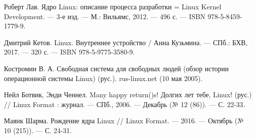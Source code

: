 




\begin{thebibliography}{99}
Роберт Лав. Ядро Linux: описание процесса разработки = Linux Kernel Development. — 3-е изд. — М.: Вильямс, 2012. — 496 с. — ISBN 978-5-8459-1779-9.

Дмитрий Кетов. Linux. Внутреннее устройство / Анна Кузьмина. — СПб.: БХВ, 2017. — 320 с. — ISBN 978-5-9775-3580-9.

Костромин В. А. Свободная система для свободных людей (обзор истории операционной системы Linux) (рус.). rus-linux.net (10 мая 2005).

Нейл Ботвик, Энди Ченнел. Many happy return()s! Долгих лет тебе, Linux! (рус.) // Linux Format : журнал. — СПб., 2006. — Декабрь (№ 12 (86)). — С. 22-33.

Маянк Шарма. Рождение ядра Linux // Linux Format. — 2016. — Октябрь (№ 10 (215)). — С. 24-31.


\end{thebibliography}

